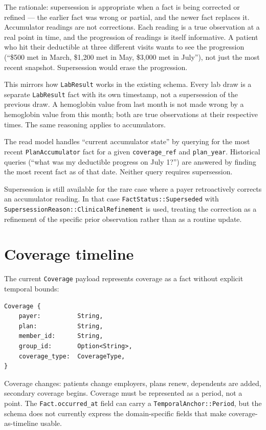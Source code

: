 \documentclass[11pt]{article}
\begin{document}
The rationale: supersession is appropriate when a fact is being
corrected or refined --- the earlier fact was wrong or partial, and the
newer fact replaces it. Accumulator readings are not corrections. Each
reading is a true observation at a real point in time, and the
progression of readings is itself informative. A patient who hit their
deductible at three different visits wants to see the progression
(``\$500 met in March, \$1{,}200 met in May, \$3{,}000 met in July''),
not just the most recent snapshot. Supersession would erase the
progression.

This mirrors how \texttt{LabResult} works in the existing schema. Every
lab draw is a separate \texttt{LabResult} fact with its own timestamp,
not a supersession of the previous draw. A hemoglobin value from last
month is not made wrong by a hemoglobin value from this month; both
are true observations at their respective times. The same reasoning
applies to accumulators.

The read model handles ``current accumulator state'' by querying for
the most recent \texttt{PlanAccumulator} fact for a given
\texttt{coverage\_ref} and \texttt{plan\_year}. Historical queries
(``what was my deductible progress on July 1?'') are answered by
finding the most recent fact as of that date. Neither query requires
supersession.

Supersession is still available for the rare case where a payer
retroactively corrects an accumulator reading. In that case
\texttt{FactStatus::Superseded} with \texttt{SupersessionReason::ClinicalRefinement}
is used, treating the correction as a refinement of the specific
prior observation rather than as a routine update.

\section{Coverage timeline}
\label{sec:coverage-timeline}

The current \texttt{Coverage} payload represents coverage as a fact
without explicit temporal bounds:

\begin{lstlisting}
Coverage {
    payer:          String,
    plan:           String,
    member_id:      String,
    group_id:       Option<String>,
    coverage_type:  CoverageType,
}
\end{lstlisting}

Coverage changes: patients change employers, plans renew, dependents are
added, secondary coverage begins. Coverage must be represented as a
period, not a point. The \texttt{Fact.occurred\_at} field can carry a
\texttt{TemporalAnchor::Period}, but the schema does not currently
express the domain-specific fields that make coverage-as-timeline
usable.
\end{document}
